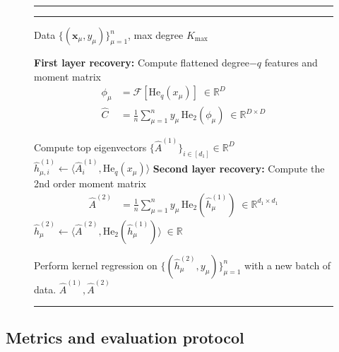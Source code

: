 \documentclass[]{article}
\numberwithin{equation}{section}
\theoremstyle{definition}
\newcommand{\R}{\mathbb{R}}
\newcommand{\He}{\mathord{\mathrm{He}}}
\newcommand{\INPUT}{\REQUIRE}
\renewcommand{\vec}[1]{\bm{#1}}
\newcommand{\bx}{\vec{x}}
\begin{document}
\begin{figure}[h]
\centering
\begin{minipage}{0.7\linewidth}

\hrule
{}

\label{alg:agnostic-recovery}
\vspace{-1em}
\hrule


\begin{algorithmic}[1]

\INPUT Data $\{(\bx_\mu,y_\mu)\}_{\mu=1}^n$, max degree $K_{\max}$

\STATE \textbf{First layer recovery:}
\STATE Compute flattened degree$-q$ features and moment matrix 
\[
\begin{aligned}
    \phi_\mu &= \mathcal F[\He_q(x_\mu)] \;\in \R^{D}\\
     \widehat C &=
  \frac{1}{n}\sum_{\mu=1}^n
  y_\mu \, \He_2( \phi_\mu) \; \in \R^{D \times D}
\end{aligned}
\]

\STATE Compute top eigenvectors $\{\widehat A^{(1)}\}_{i \in [d_1]} \in \R^{D}$
    \STATE $\widehat h^{(1)}_{\mu,i} \leftarrow
    \langle \widehat A^{(1)}_i, \He_{q}(x_\mu)\rangle$
\ENDFOR
\STATE \textbf{Second layer recovery:}
\STATE Compute the 2nd order moment matrix 
\[
\begin{aligned}
     \widehat A^{(2)} &=
  \frac{1}{n}\sum_{\mu=1}^n
  y_\mu \, \He_2( \widehat h^{(1)}_\mu)\; \in \R^{d_1\times d_1}
\end{aligned}
\]
    \STATE 
    $\widehat h^{(2)}_\mu \leftarrow
    \langle \widehat A^{(2)}, \He_{2}(\widehat h^{(1)}_\mu)\rangle\;\in\R$
\ENDFOR

\STATE Perform kernel regression on $\{(\widehat h^{(2)}_\mu,y_\mu)\}_{\mu=1}^n$ with a new batch of data. 
\RETURN $\widehat A^{(1)}, \widehat A^{(2)}$


\end{algorithmic}
\hrule

\end{minipage}
\end{figure}


\subsection{Metrics and evaluation protocol}
\label{app:metrics}

\end{document}
